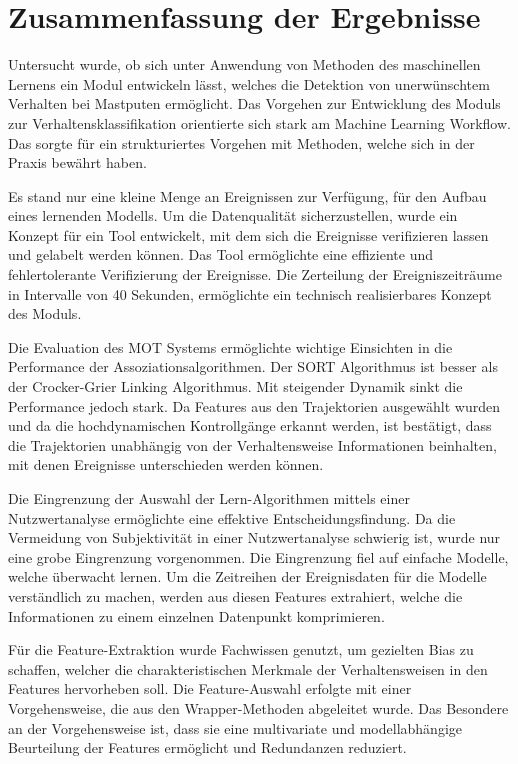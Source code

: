 \section{Zusammenfassung der Ergebnisse}
Untersucht wurde, ob sich unter Anwendung von Methoden des maschinellen Lernens ein Modul entwickeln lässt, welches die Detektion von unerwünschtem Verhalten bei Mastputen ermöglicht. Das Vorgehen zur Entwicklung des Moduls zur Verhaltensklassifikation orientierte sich stark am Machine Learning Workflow. Das sorgte für ein strukturiertes Vorgehen mit Methoden, welche sich in der Praxis bewährt haben.\par

Es stand nur eine kleine Menge an Ereignissen zur Verfügung, für den Aufbau eines lernenden Modells. Um die Datenqualität sicherzustellen, wurde ein Konzept für ein Tool entwickelt, mit dem sich die Ereignisse verifizieren lassen und gelabelt werden können. Das Tool ermöglichte eine effiziente und fehlertolerante Verifizierung der Ereignisse. Die Zerteilung der Ereigniszeiträume in Intervalle von 40 Sekunden, ermöglichte ein technisch realisierbares Konzept des Moduls.\par

Die Evaluation des MOT Systems ermöglichte wichtige Einsichten in die Performance der Assoziationsalgorithmen. Der SORT Algorithmus ist besser als der Crocker-Grier Linking Algorithmus. Mit steigender Dynamik sinkt die Performance jedoch stark. Da Features aus den Trajektorien ausgewählt wurden und da die hochdynamischen Kontrollgänge erkannt werden, ist bestätigt, dass die Trajektorien unabhängig von der Verhaltensweise Informationen beinhalten, mit denen Ereignisse unterschieden werden können.\par

Die Eingrenzung der Auswahl der Lern-Algorithmen mittels einer Nutzwertanalyse ermöglichte eine effektive Entscheidungsfindung. Da die Vermeidung von Subjektivität in einer Nutzwertanalyse schwierig ist, wurde nur eine grobe Eingrenzung vorgenommen. Die Eingrenzung fiel auf einfache Modelle, welche überwacht lernen. Um die Zeitreihen der Ereignisdaten für die Modelle verständlich zu machen, werden aus diesen Features extrahiert, welche die Informationen zu einem einzelnen Datenpunkt komprimieren. \par

Für die Feature-Extraktion wurde Fachwissen genutzt, um gezielten Bias zu schaffen, welcher die charakteristischen Merkmale der Verhaltensweisen in den Features hervorheben soll. Die Feature-Auswahl erfolgte mit einer Vorgehensweise, die aus den Wrapper-Methoden abgeleitet wurde. Das Besondere an der Vorgehensweise ist, dass sie eine multivariate und modellabhängige Beurteilung der Features ermöglicht und Redundanzen reduziert. \par

